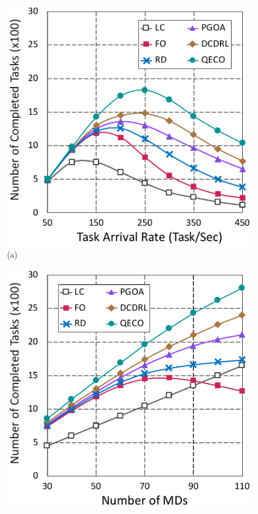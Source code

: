 \documentclass[12pt,draftclsnofoot,onecolumn]{IEEEtran}
\begin{document}
\begin{enumerate}
\setcounter{figure}{2}

\begin{figure}[H]\centering
	\captionsetup{name=Fig.}
	\begin{minipage}[b]{0.3\linewidth}
		\centering
		\includegraphics[width=\textwidth]{ drop_1} 
		\textcolor{white}{i}\hspace{0.6cm}(a)
	\end{minipage}
	\hspace{-0.2cm}
	\begin{minipage}[b]{0.3\linewidth}
		\centering
		\includegraphics[width=\textwidth]{ drop_2}

\end{minipage}
\end{figure}
\end{enumerate}
\end{document}
